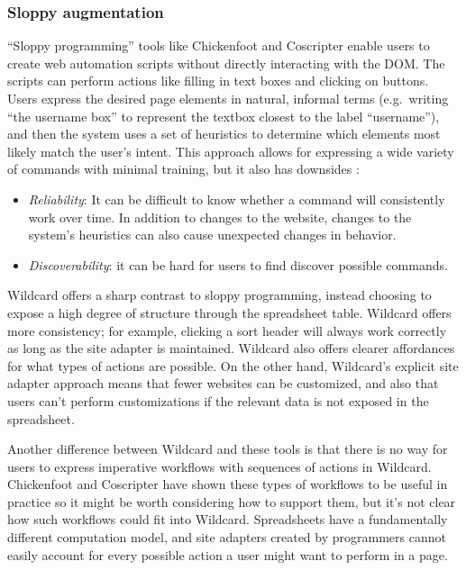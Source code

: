 \documentclass[english,submission]{programming}
\providecommand{\tightlist}{%
  \setlength{\itemsep}{0pt}\setlength{\parskip}{0pt}}
\begin{document}
\hypertarget{sloppy-augmentation}{%
\subsubsection{Sloppy augmentation}\label{sloppy-augmentation}}

``Sloppy programming'' \autocite{little2010} tools like Chickenfoot
\autocite{bolin2005} and Coscripter \autocite{leshed2008} enable users
to create web automation scripts without directly interacting with the
DOM. The scripts can perform actions like filling in text boxes and
clicking on buttons. Users express the desired page elements in natural,
informal terms (e.g.~writing ``the username box'' to represent the
textbox closest to the label ``username''), and then the system uses a
set of heuristics to determine which elements most likely match the
user's intent. This approach allows for expressing a wide variety of
commands with minimal training, but it also has downsides
\autocite{little2010}:

\begin{itemize}
\tightlist
\item
  \emph{Reliability}: It can be difficult to know whether a command will
  consistently work over time. In addition to changes to the website,
  changes to the system's heuristics can also cause unexpected changes
  in behavior.
\item
  \emph{Discoverability}: it can be hard for users to find discover
  possible commands.
\end{itemize}

Wildcard offers a sharp contrast to sloppy programming, instead choosing
to expose a high degree of structure through the spreadsheet table.
Wildcard offers more consistency; for example, clicking a sort header
will always work correctly as long as the site adapter is maintained.
Wildcard also offers clearer affordances for what types of actions are
possible. On the other hand, Wildcard's explicit site adapter approach
means that fewer websites can be customized, and also that users can't
perform customizations if the relevant data is not exposed in the
spreadsheet.

Another difference between Wildcard and these tools is that there is no
way for users to express imperative workflows with sequences of actions
in Wildcard. Chickenfoot and Coscripter have shown these types of
workflows to be useful in practice so it might be worth considering how
to support them, but it's not clear how such workflows could fit into
Wildcard. Spreadsheets have a fundamentally different computation model,
and site adapters created by programmers cannot easily account for every
possible action a user might want to perform in a page.
\end{document}
